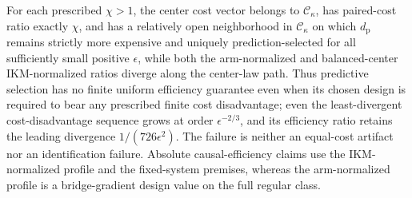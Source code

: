 For each prescribed \(\chi>1\), the center cost vector belongs to \(\mathcal C_\kappa\), has paired-cost ratio exactly \(\chi\), and has a relatively open neighborhood in \(\mathcal C_\kappa\) on which \(d_{\mathrm p}\) remains strictly more expensive and uniquely prediction-selected for all sufficiently small positive \(\epsilon\), while both the arm-normalized and balanced-center IKM-normalized ratios diverge along the center-law path. Thus predictive selection has no finite uniform efficiency guarantee even when its chosen design is required to bear any prescribed finite cost disadvantage; even the least-divergent cost-disadvantage sequence grows at order \(\epsilon^{-2/3}\), and its efficiency ratio retains the leading divergence \(1/(726\epsilon^2)\). The failure is neither an equal-cost artifact nor an identification failure. Absolute causal-efficiency claims use the IKM-normalized profile and the fixed-system premises, whereas the arm-normalized profile is a bridge-gradient design value on the full regular class.